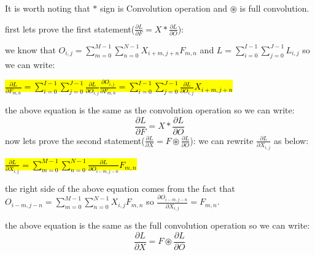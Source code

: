 It is worth noting that \( * \) sign is Convolution operation and \( \circledast \) is full convolution.
\begin{qsolve}
    \begin{qsolve}[]
        first lets prove the first statement(\( \frac{\partial L}{\partial F} = X * \frac{\partial L}{\partial O} \)):

        we know that $O_{i,j} = \sum_{m=0}^{M-1} \sum_{n=0}^{N-1} X_{i+m,j+n} F_{m,n}$ and $L = \sum_{i=0}^{I-1} \sum_{j=0}^{J-1} L_{i,j}$ so we can write:
        
        \begin{center}
            \hl{$ \frac{\partial L}{\partial F_{m,n}} = \sum_{i=0}^{I-1} \sum_{j=0}^{J-1} \frac{\partial L}{\partial O_{i,j}} \frac{\partial O_{i,j}}{\partial F_{m,n}} = \sum_{i=0}^{I-1} \sum_{j=0}^{J-1} \frac{\partial L}{\partial O_{i,j}} X_{i+m,j+n}$}       
        \end{center}
        
        the above equation is the same as the convolution operation so we can write:
        $$ \frac{\partial L}{\partial F} = X * \frac{\partial L}{\partial O}$$
        \splitqsolve[\splitqsolve]
        now lets prove the second statement(\( \frac{\partial L}{\partial X} = F \circledast \frac{\partial L}{\partial O} \)):
        we can rewrite $\frac{\partial L}{\partial X_{i,j}}$ as below:

        \begin{center}
            \hl{$ \frac{\partial L}{\partial X_{i,j}} = \sum_{m=0}^{M-1} \sum_{n=0}^{N-1} \frac{\partial L}{\partial O_{i-m,j-n}} F_{m,n}$}
        \end{center}

        the right side of the above equation comes from the fact that $O_{i-m , j-n} = \sum_{m=0}^{M-1} \sum_{n=0}^{N-1} X_{i,j} F_{m,n}$ so $\frac{\partial O_{i-m,j-n}}{\partial X_{i,j}} = F_{m,n}$.

        the above equation is the same as the full convolution operation so we can write:
        $$ \frac{\partial L}{\partial X} = F \circledast \frac{\partial L}{\partial O}$$
    \end{qsolve}
\end{qsolve}
